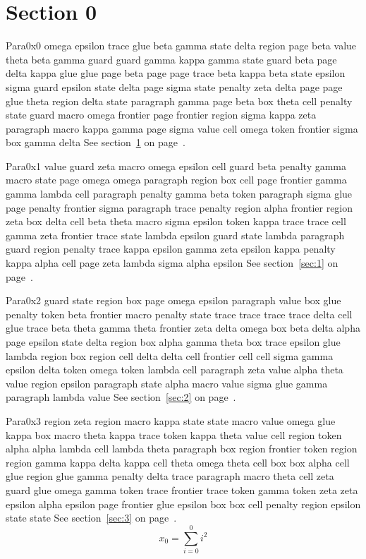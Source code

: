 \documentclass{article}
\begin{document}
\tableofcontents
\section{Section 0}\label{sec:0}
Para0x0 omega epsilon trace glue beta gamma state delta region page beta value theta beta gamma guard guard gamma kappa gamma state guard beta page delta kappa glue glue page beta page page trace beta kappa beta state epsilon sigma guard epsilon state delta page sigma state penalty zeta delta page page glue theta region delta state paragraph gamma page beta box theta cell penalty state guard macro omega frontier page frontier region sigma kappa zeta paragraph macro kappa gamma page sigma value cell omega token frontier sigma box gamma delta See section~\ref{sec:0} on page~\pageref{sec:0}.

Para0x1 value guard zeta macro omega epsilon cell guard beta penalty gamma macro state page omega omega paragraph region box cell page frontier gamma gamma lambda cell paragraph penalty gamma beta token paragraph sigma glue page penalty frontier sigma paragraph trace penalty region alpha frontier region zeta box delta cell beta theta macro sigma epsilon token kappa trace trace cell gamma zeta frontier trace state lambda epsilon guard state lambda paragraph guard region penalty trace kappa epsilon gamma zeta epsilon kappa penalty kappa alpha cell page zeta lambda sigma alpha epsilon See section~\ref{sec:1} on page~\pageref{sec:1}.

Para0x2 guard state region box page omega epsilon paragraph value box glue penalty token beta frontier macro penalty state trace trace trace trace delta cell glue trace beta theta gamma theta frontier zeta delta omega box beta delta alpha page epsilon state delta region box alpha gamma theta box trace epsilon glue lambda region box region cell delta delta cell frontier cell cell sigma gamma epsilon delta token omega token lambda cell paragraph zeta value alpha theta value region epsilon paragraph state alpha macro value sigma glue gamma paragraph lambda value See section~\ref{sec:2} on page~\pageref{sec:2}.

Para0x3 region zeta region macro kappa state state macro value omega glue kappa box macro theta kappa trace token kappa theta value cell region token alpha alpha lambda cell lambda theta paragraph box region frontier token region region gamma kappa delta kappa cell theta omega theta cell box box alpha cell glue region glue gamma penalty delta trace paragraph macro theta cell zeta guard glue omega gamma token trace frontier trace token gamma token zeta zeta epsilon alpha epsilon page frontier glue epsilon box box cell penalty region epsilon state state See section~\ref{sec:3} on page~\pageref{sec:3}.
\begin{equation} x_{0} = \sum_{i=0}^{0} i^2 \label{eq:0}\end{equation}
\end{document}
